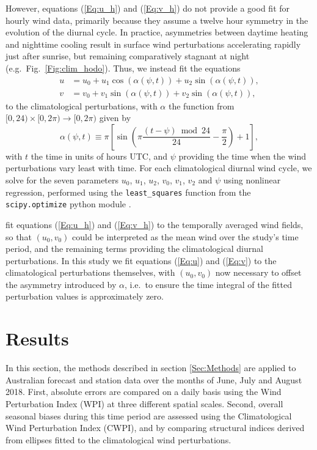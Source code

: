 \documentclass[twocol]{ametsoc}
\begin{document}
However, equations (\ref{Eq:u_h}) and (\ref{Eq:v_h}) do not provide a good fit for hourly wind data, primarily because they assume a twelve hour symmetry in the evolution of the diurnal cycle. In practice, asymmetries between daytime heating and nighttime cooling \citep[e.g.][]{svensson11} result in surface wind perturbations accelerating rapidly just after sunrise, but remaining comparatively stagnant at night (e.g.~Fig.~\ref{Fig:clim_hodo}). Thus, we instead fit the equations
\begin{align}
u &= u_0 + u_1 \cos(\alpha(\psi,t)) + u_2 \sin(\alpha(\psi,t)), \label{Eq:u} \\
v &= v_0 + v_1 \sin(\alpha(\psi,t)) + v_2 \sin(\alpha(\psi,t)), \label{Eq:v}
\end{align}
to the climatological perturbations, with $\alpha$ the function from $[0,24) \times [0, 2\pi) \to [0, 2\pi)$ given by
\begin{equation}
\alpha(\psi,t) \equiv \pi \left[\sin\left( \pi \frac{(t - \psi)  \bmod 24}{24} - \frac{\pi}{2} \right) + 1 \right], \label{Eq:alpha}
\end{equation}
with $t$ the time in units of hours UTC, and $\psi$ providing the time when the wind perturbations vary least with time. For each climatological diurnal wind cycle, we solve for the seven parameters $u_0$, $u_1$, $u_2$, $v_0$, $v_1$, $v_2$ and $\psi$ using nonlinear regression, performed using the \texttt{least\_squares} function from the \texttt{scipy.optimize} python module \citep{scipy19}.

\citet{gille05} fit equations (\ref{Eq:u_h}) and (\ref{Eq:v_h}) to the temporally averaged wind fields, so that $\left(u_0, v_0\right)$ could be interpreted as the mean wind over the study's time period, and the remaining terms providing the climatological diurnal perturbations. In this study we fit equations (\ref{Eq:u}) and (\ref{Eq:v}) to the climatological perturbations themselves, with $\left(u_0, v_0\right)$ now necessary to offset the asymmetry introduced by $\alpha$, i.e.~to ensure the time integral of the fitted perturbation values is approximately zero. 

\section{Results}
\label{Sec:Results}
In this section, the methods described in section \ref{Sec:Methods} are applied to Australian forecast and station data over the months of June, July and August 2018. First, absolute errors are compared on a daily basis using the Wind Perturbation Index (WPI) at three different spatial scales. Second, overall seasonal biases during this time period are assessed using the Climatological Wind Perturbation Index (CWPI), and by comparing structural indices derived from ellipses fitted to the climatological wind perturbations.
\end{document}
